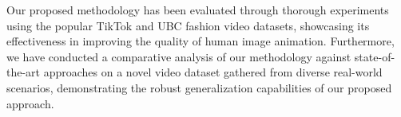 Our proposed methodology has been evaluated through thorough experiments using the popular TikTok and UBC fashion video datasets, showcasing its effectiveness in improving the quality of human image animation.
Furthermore, we have conducted a comparative analysis of our methodology against state-of-the-art approaches on a novel video dataset gathered from diverse real-world scenarios, demonstrating the robust generalization capabilities of our proposed approach.
